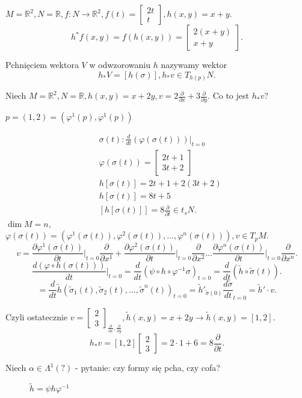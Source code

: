 \documentclass[../main.tex]{subfiles}
\begin{document}
\begin{przyklad}
    $M = \mathbb{R}^2, N = \mathbb{R}, f: N\to \mathbb{R}^2, f(t) = \begin{bmatrix} 2t\\t \end{bmatrix}, h(x,y) = x+y $.
    \[
        h^*f(x,y) = f(h(x,y)) = \begin{bmatrix} 2(x+y)\\x+y \end{bmatrix}
    .\]
\end{przyklad}
Pchnięciem wektora $V$ w odwzorowaniu $h$ nazywamy wektor
\[
    h_* V = \left[ h(\sigma) \right], h_*v\in T_{h(p)}N
.\]
\begin{przyklad}
    Niech $M = \mathbb{R}^2, N = \mathbb{R}, h(x,y) = x+2y, v = 2 \frac{\partial }{\partial x} + 3 \frac{\partial }{\partial y}$. Co to jest $h_*v$?

    $p = (1,2) = (\varphi^1(p),\varphi^1(p))$

    \begin{align*}
        &\sigma(t): \frac{d}{dt}(\varphi(\sigma(t)))\vert_{t=0}\\
        &\varphi(\sigma(t)) = \begin{bmatrix} 2t+1\\3t+2 \end{bmatrix}\\
        &h[\sigma(t)] = 2t+1 + 2(3t+2)\\
        &h[\sigma(t)] = 8t+5\\
        &\left[ h[\sigma(t)] \right] = 8 \frac{\partial }{\partial t} \in t_sN
    .\end{align*}
    $\dim M = n$, $\varphi(\sigma(t)) = \left( \varphi^1(\sigma(t)), \varphi^2(\sigma(t)),\ldots,\varphi^n(\sigma(t)) \right), v\in T_pM $.\\
    \[
        v = \frac{\partial \varphi^1(\sigma(t))}{\partial t} \vert_{t=0} \frac{\partial }{\partial x^1} + \frac{\partial \varphi^2(\sigma(t))}{\partial t} \vert_{t=0} \frac{\partial }{\partial x^2} \ldots \frac{\partial \varphi^n(\sigma(t))}{\partial t} \vert_{t=0} \frac{\partial }{\partial x^n}
    .\]
\[
    \frac{d(\varphi\circ h(\sigma(t)))}{dt}\vert_{t=0} = \frac{d}{dt}\left( \psi \circ h \circ \varphi^{-1} \sigma \right)_{t=0} = \frac{d}{dt}\left( \tilde h \circ \tilde \sigma(t) \right)
.\]
\[
    = \frac{d}{dt}\tilde h\left( \tilde \sigma_1(t), \tilde \sigma_2(t), \ldots, \tilde \sigma^n(t) \right)_{t=0} = \tilde h'_{\tilde \sigma(0)} \frac{d\tilde \sigma}{dt}_{t=0} = \tilde h'\cdot v
.\]

Czyli ostatecznie $v = \begin{bmatrix} 2\\3 \end{bmatrix}_{\frac{\partial }{\partial x}, \frac{\partial }{\partial y} }, \tilde h(x,y) = x+2y \to \tilde h(x,y) = \left[ 1,2 \right] $.\\
\[
    h_* v = \left[ 1,2 \right] \begin{bmatrix} 2\\3 \end{bmatrix} = 2\cdot 1+ 6 = 8 \frac{\partial }{\partial t}
.\]
\end{przyklad}

Niech $\alpha\in \Lambda^1(?)$ - pytanie: czy formy się pcha, czy cofa?


\begin{figure}[h]
    \centering
    \caption{$\tilde h = \psi h \varphi^{-1}$ }
    \label{fig:fig_56}
\end{figure}
\end{document}

